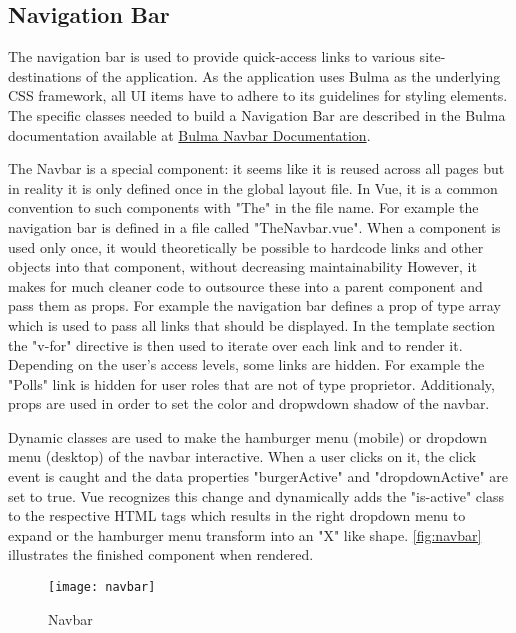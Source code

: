 \subsection{Navigation Bar}
The navigation bar is used to provide quick-access links to various site-destinations of the application.
As the application uses Bulma as the underlying CSS framework, all UI items have to adhere to its guidelines for styling elements. The specific classes needed to build a Navigation Bar are described in the Bulma documentation available at \href{https://bulma.io/documentation/components/navbar/}{Bulma Navbar Documentation}.

The Navbar is a special component: it seems like it is reused across all pages but in reality it is only defined once in the global layout file. In Vue, it is a common convention to such components with "The" in the file name. For example the navigation bar is defined in a file called "TheNavbar.vue". When a component is used only once, it would theoretically be possible to hardcode links and other objects into that component, without decreasing maintainability However, it makes for much cleaner code to outsource these into a parent component and pass them as props. For example the navigation bar defines a prop of type array which is used to pass all links that should be displayed. In the template section the "v-for" directive is then used to iterate over each link and to render it. Depending on the user's access levels, some links are hidden. For example the "Polls" link is hidden for user roles that are not of type proprietor. Additionaly, props are used in order to set the color and dropwdown shadow of the navbar.

Dynamic classes are used to make the hamburger menu (mobile) or dropdown menu (desktop) of the navbar interactive. When a user clicks on it, the click event is caught and the data properties "burgerActive" and "dropdownActive" are set to true. Vue recognizes this change and dynamically adds the "is-active" class to the respective HTML tags which results in the right dropdown menu to expand or the hamburger menu transform into an "X" like shape. \autoref{fig:navbar} illustrates the finished component when rendered.

\begin{figure}[H]
  \begin{center}
  \texttt{[image: navbar]}
  \end{center}
  \caption{Navbar}
  \label{fig:navbar}
\end{figure}


